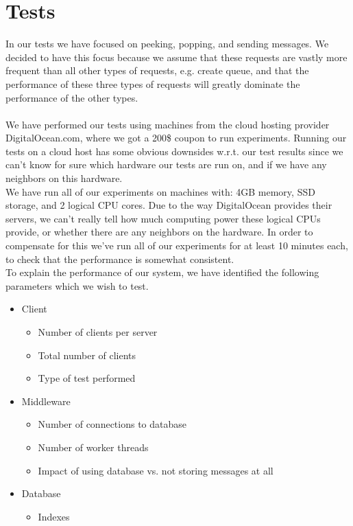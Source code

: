\documentclass{article}
\begin{document}
    \section{Tests}
        In our tests we have focused on peeking, popping, and sending messages. We decided to have this focus because we assume that these requests are vastly more frequent than all other types of requests, e.g. create queue, and that the performance of these three types of requests will greatly dominate the performance of the other types.\\
        \\
        We have performed our tests using machines from the cloud hosting provider DigitalOcean.com, where we got a 200\$ coupon to run experiments. Running our tests on a cloud host has some obvious downsides w.r.t. our test results since we can't know for sure which hardware our tests are run on, and if we have any neighbors on this hardware.\\
        We have run all of our experiments on machines with: 4GB memory, SSD storage, and 2 logical CPU cores. Due to the way DigitalOcean provides their servers, we can't really tell how much computing power these logical CPUs provide, or whether there are any neighbors on the hardware. In order to compensate for this we've run all of our experiments for at least 10 minutes each, to check that the performance is somewhat consistent.
        \\
        To explain the performance of our system, we have identified the following parameters which we wish to test.
        \begin{itemize}
            \item Client
            \begin{itemize}
                \item Number of clients per server
                \item Total number of clients
                \item Type of test performed
            \end{itemize}
            \item Middleware
            \begin{itemize}
                \item Number of connections to database
                \item Number of worker threads
                \item Impact of using database vs. not storing messages at all
            \end{itemize}
            \item Database
            \begin{itemize}
                \item Indexes
            \end{itemize}
        \end{itemize}
\end{document}
